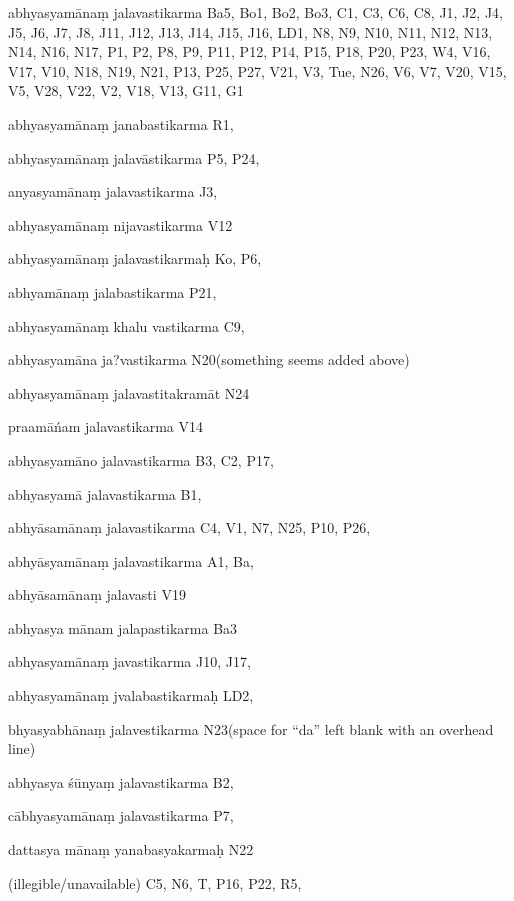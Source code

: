 \begin{ekdosis}
\begin{marma}[hp01_055]
\begin{marma}[hp02_009]
\begin{marma}[hp02_011]
\begin{marma}[hp02_29c]
\begin{description}
    \end{description}
 \end{marma}

 \begin{marma}[hp02_29d]
\item[abhyasyamānaṃ jalavastikarma] Ba5, Bo1, Bo2, Bo3, C1, C3, C6, C8, J1, J2, J4, J5, J6, J7, J8, J11, J12, J13, J14, J15, J16, LD1, N8, N9, N10, N11, N12, N13, N14, N16, N17, P1, P2, P8, P9, P11,  P12, P14, P15, P18, P20, P23, W4, V16, V17, V10, N18, N19, N21, P13, P25, P27, V21, V3, Tue, N26, V6, V7, V20, V15, V5, V28, V22, V2, V18, V13, G11, G1
\item[abhyasyamānaṃ janabastikarma] R1,
\item[abhyasyamānaṃ jalavāstikarma] P5, P24, 
\item[anyasyamānaṃ jalavastikarma] J3,
\item[abhyasyamānaṃ nijavastikarma] V12
\item[abhyasyamānaṃ jalavastikarmaḥ] Ko, P6, 
\item[abhyamānaṃ jalabastikarma] P21, 
\item[abhyasyamānaṃ khalu vastikarma] C9,
\item[abhyasyamāna ja?vastikarma] N20(something seems added above)
\item[abhyasyamānaṃ jalavastitakramāt] N24
\item[praamāńam jalavastikarma] V14
\item[abhyasyamāno jalavastikarma] B3, C2, P17, 
\item[abhyasyamā jalavastikarma] B1,
\item[abhyāsamānaṃ jalavastikarma] C4, V1, N7, N25, P10, P26, 
\item[abhyāsyamānaṃ jalavastikarma] A1, Ba,
\item[abhyāsamānaṃ jalavasti] V19
\item[abhyasya mānam jalapastikarma] Ba3
\item[abhyasyamānaṃ javastikarma] J10, J17,
\item[abhyasyamānaṃ jvalabastikarmaḥ] LD2,
\item[bhyasyabhānaṃ jalavestikarma] N23(space for “da” left blank with an overhead line)
\item[abhyasya śūnyaṃ jalavastikarma] B2,
\item[cābhyasyamānaṃ jalavastikarma] P7, 
\item[dattasya mānaṃ yanabasyakarmaḥ] N22
\item[(illegible/unavailable)] C5, N6, T, P16, P22, R5,
  \begin{description}


\end{description}
\end{marma}
\end{marma}
\end{marma}
\end{marma}
\end{ekdosis}
